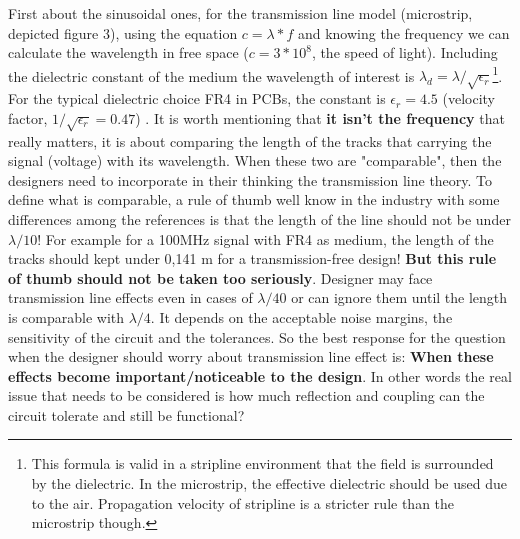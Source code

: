 \documentclass[final]{cubedoc}
\begin{document}
	
	First about the sinusoidal ones, for the transmission line model (microstrip, depicted figure 3), using the equation $ c = \lambda*f$ and knowing the frequency we can calculate the wavelength in free space ($c = 3*10^8$, the speed of light). Including the dielectric constant of the medium the wavelength of interest is $\lambda_d = \lambda/\sqrt{\epsilon_r}$\footnote{This formula is valid in a stripline environment that the field is surrounded by the dielectric. In the microstrip, the effective dielectric should be used due to the air. Propagation velocity of stripline is a stricter rule than the microstrip though.}. For the typical dielectric choice FR4 in PCBs, the constant is $\epsilon_r = 4.5$ (velocity factor, $1/\sqrt{\epsilon_r} = 0.47$) \cite[p.46]{williams2004circuit}.
	It is worth mentioning that \textbf{it isn't the frequency} that really matters, it is about comparing the length of the tracks that carrying the signal (voltage) with its wavelength. When these two are "comparable", then the designers need to incorporate in their thinking the transmission line theory. To define what is comparable, a rule of thumb well know in the industry with some differences among the references is that the length of the line should not be under $\lambda/10$! For example for a 100MHz signal with FR4 as medium, the length of the tracks should kept under 0,141 m for a transmission-free design! \textbf{But this rule of thumb should not be taken too seriously}. Designer may face transmission line effects even in cases of $\lambda/40$ or can ignore them until the length is comparable with $\lambda/4$. It depends on the acceptable noise margins, the sensitivity of the circuit and the tolerances. So the best response for the question when the designer should worry about transmission line effect is: \textbf{When these effects become important/noticeable to the design}. In other words the real issue that needs to be considered is how much reflection and coupling can the circuit tolerate and still be functional? 
\end{document}
